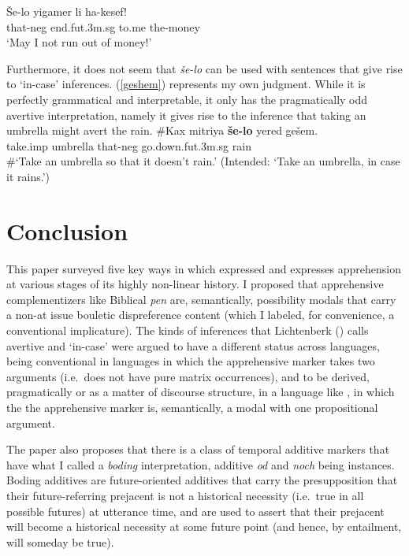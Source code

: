 \documentclass[output=paper,colorlinks,citecolor=brown]{langscibook}
\begin{document}
\ea
\label{wish}
\gll \v{S}e-lo yigamer li ha-kesef! \\
that-{\sc neg} end.{\sc fut.3m.sg} to.me the-money\\
\glt `May I not run out of money!'
\z

Furthermore, it  does not seem that \textit{še-lo} can be used with sentences that give rise to `in-case' inferences. (\ref{geshem}) represents my own judgment. While it is perfectly grammatical and interpretable, it only has the pragmatically odd avertive interpretation, namely it gives rise to the inference that taking an umbrella might avert the rain.
\ea
\label{geshem}
\gll \#Kax mitriya \textbf{še-lo} yered gešem. \\
take.{\sc imp} umbrella that-{\sc neg} go.down.{\sc fut.3m.sg} rain \\
\glt \#`Take an umbrella so that it doesn't rain.' (Intended: `Take an umbrella, in case it rains.') 
\z


\section{Conclusion}
\label{sec:conclusion}

This paper surveyed five key ways in which  expressed and expresses apprehension at various stages of its highly non-linear history. I proposed that apprehensive complementizers like Biblical  \textit{pen} are, semantically, possibility modals that carry a non-at issue bouletic dispreference content (which I labeled, for convenience, a conventional implicature). The kinds of inferences that Lichtenberk (\citeyear{lichtenberk95}) calls avertive and `in-case' were argued to have a different status across languages, being conventional in languages in which the apprehensive marker takes two arguments (i.e.\ does not have pure matrix occurrences), and to be derived, pragmatically or as a matter of discourse structure, in a language like , in which the the apprehensive marker is, semantically, a modal with one propositional argument. 

The paper also proposes that there is a class of temporal additive markers that have what I called a \textit{boding} interpretation,  additive \textit{od} and  \textit{noch} being instances. Boding additives are future-oriented additives that carry the presupposition that their future-referring prejacent is not a historical necessity (i.e.\ true in all possible futures) at utterance time, and are used to assert that their prejacent will become a historical necessity at some future point (and hence, by entailment, will someday be true).
\end{document}

